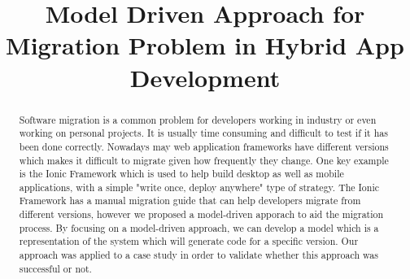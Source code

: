 \documentclass[conference]{IEEEtran}
\begin{document}
\title{Model Driven Approach for Migration Problem in Hybrid App Development\\}

\author{
\and
{}
\and
{}
\and
{}
}

\maketitle

\begin{abstract}
Software migration is a common problem for developers working in industry or even working on personal projects. It is usually time consuming
and difficult to test if it has been done correctly. Nowadays may web application frameworks have different versions which makes it difficult
to migrate given how frequently they change. One key example is the Ionic Framework which is used to help build desktop as well as mobile applications,
with a simple "write once, deploy anywhere" type of strategy. The Ionic Framework has a manual migration guide that can help developers migrate from 
different versions, however we proposed a model-driven apporach to aid the migration process. By focusing on a model-driven approach, we can develop a model
which is a representation of the system which will generate code for a specific version. Our approach was applied to a case study in order to validate
whether this approach was successful or not. 
\end{abstract}
\end{document}
